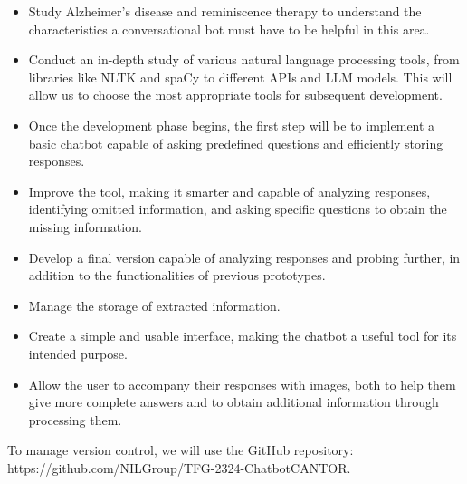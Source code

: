 \begin{itemize}
	\item Study Alzheimer's disease and reminiscence therapy to understand the characteristics a conversational bot must have to be helpful in this area.
	\item Conduct an in-depth study of various natural language processing tools, from libraries like NLTK and spaCy to different APIs and LLM models. This will allow us to choose the most appropriate tools for subsequent development.
	\item Once the development phase begins, the first step will be to implement a basic chatbot capable of asking predefined questions and efficiently storing responses.
	\item Improve the tool, making it smarter and capable of analyzing responses, identifying omitted information, and asking specific questions to obtain the missing information.
	\item Develop a final version capable of analyzing responses and probing further, in addition to the functionalities of previous prototypes.
	\item Manage the storage of extracted information.
	\item Create a simple and usable interface, making the chatbot a useful tool for its intended purpose.
	\item Allow the user to accompany their responses with images, both to help them give more complete answers and to obtain additional information through processing them.
\end{itemize}

To manage version control, we will use the GitHub repository: \\
https://github.com/NILGroup/TFG-2324-ChatbotCANTOR.

